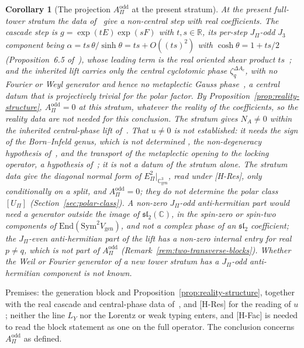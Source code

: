 \documentclass[11pt]{article}
\newtheorem{corollary}{Corollary}
\theoremstyle{definition}
\theoremstyle{remark}
\newcommand{\JPi}{J_{\Pi}}
\newcommand{\Jthree}{J_{3}}
\newcommand{\Cgen}{\mathbb{C}^{3}_{\mathrm{gen}}}
\newcommand{\Epi}{E_{\Pi}}
\newcommand{\LY}{L_{Y}}
\newcommand{\Upi}{U_{\Pi}}
\newcommand{\Aodd}{A_{\Pi}^{\mathrm{odd}}}
\newcommand{\Sym}{\mathrm{Sym}}
\begin{document}
    \begin{corollary}[The projection $\Aodd$ at the present stratum]
      \label{cor:negative-closure-present-stratum}
      At the present full-tower stratum the data of~\cite{Beau2026prs, Beau2026aar, Beau2026cho} give a non-central
      step with real coefficients.
      The cascade step is $g = \exp(tE)\exp(sF)$ with $t, s \in \mathbb{R}$, its per-step $\JPi$-odd $\Jthree$
      component being $\alpha = ts\,\theta/\sinh\theta = ts + O((ts)^{2})$ with $\cosh\theta = 1 + ts/2$
      (Proposition~6.5 of~\cite{Beau2026q14}),
      whose leading term is the real oriented shear product $ts$~\cite{Beau2026prs, Beau2026aar};
      and the inherited lift carries only the central cyclotomic phase $\zeta_{q}^{\Delta A_{c}}$, with no Fourier or
      Weyl generator and hence no metaplectic Gauss phase~\cite{Beau2026cho}, a central datum that is projectively
      trivial for the polar factor.
      By Proposition~\ref{prop:reality-structure}, $\Aodd = 0$ at this stratum, whatever the reality
      of the coefficients, so the reality data are not needed for this conclusion.
      The stratum gives $N_{A} \neq 0$ within the inherited central-phase lift of~\cite{Beau2026cho}.
      That $u \neq 0$ is not established: it needs the sign of the Born--Infeld genus, which is not determined
      \cite{Beau2026bim}, the non-degeneracy hypothesis of~\cite{Beau2026bim}, and the transport of the metaplectic
      opening to the locking operator, a hypothesis of~\cite{Beau2026prs}; it is not a datum of the stratum alone.
      The stratum data give the diagonal normal form of $\Epi^{2}|_{\Cgen}$, read under [H-Res], only conditionally
      on a split, and $\Aodd = 0$; they do not determine the polar class $[\Upi]$
      (Section~\ref{sec:polar-class}).
      A non-zero $\JPi$-odd anti-hermitian part would need a generator outside the image of
      $\mathfrak{sl}_{2}(\mathbb{C})$, in the spin-zero or spin-two components of
      $\mathrm{End}(\Sym^{2} V_{\mathrm{gen}})$, and not a complex phase of an $\mathfrak{sl}_{2}$ coefficient; the
      $\JPi$-even anti-hermitian part of the lift has a non-zero internal entry for real $p \neq q$, which is not part
      of $\Aodd$ (Remark~\ref{rem:two-transverse-blocks}).
      Whether the Weil or Fourier generator of a new tower stratum has a $\JPi$-odd anti-hermitian component is not
      known.
    \end{corollary}

    Premises: the generation block and Proposition~\ref{prop:reality-structure}, together with the real cascade
    and central-phase data of~\cite{Beau2026prs, Beau2026aar, Beau2026cho}, and [H-Res] for the reading of $u$;
    neither the line $\LY$ nor the Lorentz or weak typing enters, and [H-Fac] is needed to read the block statement as
    one on the full operator.
    The conclusion concerns $\Aodd$ as defined.
\end{document}
